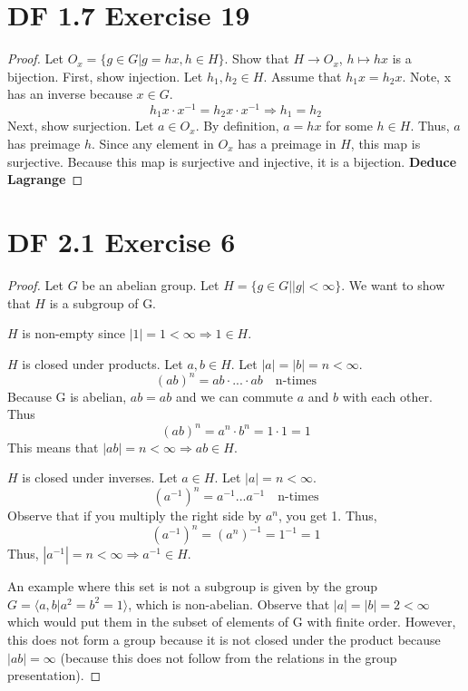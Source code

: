 \documentclass{article}
\begin{document}
\section{DF 1.7 Exercise 19}
\begin{proof}
Let $O_x = \{g \in G | g = hx, h \in H\}$. Show that $H \rightarrow O_x$, $h \mapsto hx$ is a bijection. First, show injection. Let $h_1, h_2 \in H$. Assume that $h_1x = h_2x$. Note, x has an inverse because $x \in G$.
\[
h_1x \cdot x^{-1} = h_2x \cdot x^{-1} \Rightarrow h_1 = h_2
\]
Next, show surjection. Let $a \in O_x$. By definition, $a = hx$ for some $h \in H$. Thus, $a$ has preimage $h$. Since any element in $O_x$ has a preimage in $H$, this map is surjective. Because this map is surjective and injective, it is a bijection.
\textbf{Deduce Lagrange}
\end{proof}

\section{DF 2.1 Exercise 6}
\begin{proof}
Let $G$ be an abelian group. Let $H=\{g \in G | |g| < \infty\}$. We want to show that $H$ is a subgroup of G.

$H$ is non-empty since $|1| = 1 < \infty \Rightarrow 1 \in H$.

$H$ is closed under products. Let $a, b \in H$. Let $|a|=|b|=n<\infty$.
\[
(ab)^n = ab \cdot ... \cdot ab \quad \textrm{n-times}
\]
Because G is abelian, $ab=ab$ and we can commute $a$ and $b$ with each other. Thus
\[
(ab)^n = a^n \cdot b^n = 1 \cdot 1 = 1
\]
This means that $|ab| = n < \infty \Rightarrow ab \in H$.

$H$ is closed under inverses. Let $a \in H$. Let $|a|=n < \infty$. 
\[
(a^{-1})^n = a^{-1}...a^{-1} \quad \textrm{n-times}
\]
Observe that if you multiply the right side by $a^n$, you get 1. Thus,
\[
(a^{-1})^n = (a^n)^{-1} = 1^{-1} = 1
\]
Thus, $|a^{-1}| = n < \infty \Rightarrow a^{-1} \in H$.

An example where this set is not a subgroup is given by the group $G=\langle a, b | a^2=b^2=1 \rangle$, which is non-abelian. Observe that $|a|=|b|=2<\infty$ which would put them in the subset of elements of G with finite order. However, this does not form a group because it is not closed under the product because $|ab| = \infty$ (because this does not follow from the relations in the group presentation).
\end{proof}
\end{document}
